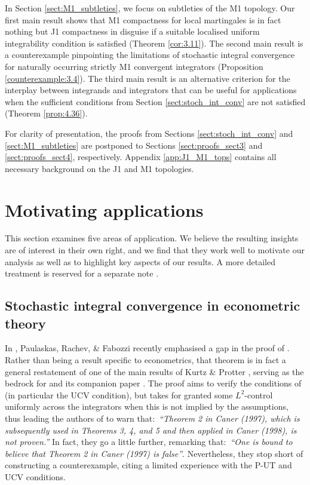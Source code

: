 \documentclass[11pt]{article}
\theoremstyle{definition}\newtheorem{example}[theorem]{Example}
\theoremstyle{definition}\newtheorem{counterexample}[theorem]{Counterexample}
\theoremstyle{definition}\newtheorem{remark}[theorem]{Remark}
\theoremstyle{definition}\newtheorem{defi}[theorem]{Definition}
\numberwithin{equation}{section}
\renewcommand{\|}{\; : \, \;}											%
\begin{document}
In Section \ref{sect:M1_subtleties}, we focus on subtleties of the M1 topology. Our first main result shows that M1 compactness for local martingales is in fact nothing but J1 compactness in disguise if a suitable localised uniform integrability condition is satisfied (Theorem \ref{cor:3.11}). The second main result is a counterexample pinpointing the limitations of stochastic integral convergence for naturally occurring strictly M1 convergent integrators (Proposition \ref{counterexample:3.4}). The third main result is an alternative criterion for the interplay between integrands and integrators that can be useful for applications when the sufficient conditions from Section \ref{sect:stoch_int_conv} are not satisfied (Theorem \ref{prop:4.36}).

For clarity of presentation, the proofs from Sections \ref{sect:stoch_int_conv} and \ref{sect:M1_subtleties} are postponed to Sections \ref{sect:proofs_sect3} and \ref{sect:proofs_sect4}, respectively. Appendix \ref{app:J1_M1_tops} contains all necessary background on the J1 and M1 topologies.



\section{Motivating applications}\label{sect:applications_brief}

This section examines five areas of application. We believe the resulting insights are of interest in their own right, and we find that they work well to motivate our analysis as well as to highlight key aspects of our results. A more detailed treatment is reserved for a separate note \cite{andreasfabrice_applications}.



\subsection{Stochastic integral convergence in econometric theory}\label{sect:econometrics}



In \cite{fabozzi_comment}, Paulaskas, Rachev, \& Fabozzi recently emphasised a gap in the proof of \cite[Thm.~2]{caner1}. Rather than being a result specific to econometrics, that theorem is in fact a general restatement of one of the main results of Kurtz \& Protter \cite{kurtzprotter}, serving as the bedrock for \cite{caner1} and its companion paper \cite{caner2}. The proof aims to verify the conditions of \cite[Thm.~2.7]{kurtzprotter} (in particular the UCV condition), but takes for granted some $L^2$-control uniformly across the integrators when this is not implied by the assumptions, thus leading the authors of \cite{fabozzi_comment} to warn that:~\emph{``Theorem 2 in Caner (1997), which is subsequently used in Theorems 3, 4, and 5 and then applied in Caner (1998), is not proven.''} In fact, they go a little further, remarking that:~\emph{``One is bound to believe that Theorem 2 in Caner (1997) is false''}. Nevertheless, they stop short of constructing a counterexample, citing a limited experience with the P-UT and UCV conditions.
\end{document}
